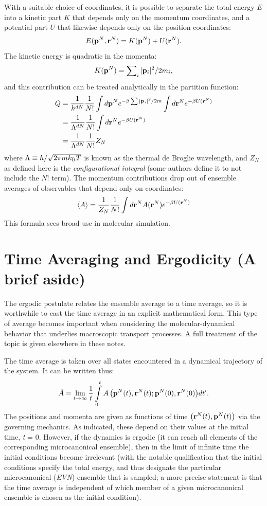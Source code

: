 \documentclass[9pt,bestpractices]{molsim}
\begin{document}
With a suitable choice of coordinates, it is possible to separate the
total energy $E$ into a kinetic part $K$ that depends only on
the momentum coordinates, and a potential part $U$ that likewise
depends only on the position coordinates:
\[E({{\bf{p}}^N},{{\bf{r}}^N}) = K({{\bf{p}}^N}) + U({{\bf{r}}^N}).\]
The kinetic energy is quadratic in the momenta:
\[K({{\bf p}^N}) = \sum\nolimits_i {|{\bf p}_i|^2/2{m_i}}, \]
and this contribution can be treated analytically in the partition
function:
\begin{align}
Q &= \frac{1}{{h^{dN}}}\frac{1}{N!}\int {d{{\bf p}^N}{e^{ - \beta \sum {|{\bf p}_i|^2/2m} }}\int {d{{\bf r}^N}} {e^{ - \beta U({{\bf r}^N})}}} \nonumber\\
 &= \frac{1}{{\Lambda ^{dN}}}\frac{1}{N!}\int {d{{\bf r}^N}} {e^{ - \beta U({{\bf r}^N})}}\nonumber\\
 &= \frac{1}{{\Lambda ^{dN}}}\frac{1}{N!}{Z_N}\nonumber
\end{align}
where $\Lambda \equiv h/\sqrt{2\pi mk_{\rm B}T}$ is known as the thermal de Broglie wavelength, and
$Z_N$ as defined here is the \emph{configurational
integral} (some authors define it to not include the ${N}!$ term).
The momentum contributions drop out of ensemble averages of observables
that depend only on coordinates:
\[\left\langle A \right\rangle  = \frac{1}{{{Z_N}}}\frac{1}{{N!}}\int {d{{\bf{r}}^N}A({{\bf{r}}^N}){e^{ - \beta U({{\bf{r}}^N})}}} \]
This formula sees broad use in molecular simulation.

\section{Time Averaging and Ergodicity (A brief
aside)}\label{time-averaging-and-ergodicity-a-brief-aside}

The ergodic postulate relates the ensemble average to a time average, so
it is worthwhile to cast the time average in an explicit mathematical
form. This type of average becomes important when considering the
molecular-dynamical behavior that underlies macroscopic transport
processes. A full treatment of the topic is given elsewhere in these notes.

The time average is taken over all states encountered in a dynamical
trajectory of the system. It can be written thus:
\[\bar A = \mathop {\lim }\limits_{t \to \infty } \frac{1}{t}\int\limits_0^t {A\left( {{{\bf{p}}^N}(t),{{\bf{r}}^N}(t);{{\bf{p}}^N}(0),{{\bf{r}}^N}(0)} \right)} dt'.\]
The positions and momenta are given as functions of time $\left( {{{\bf{r}}^N}(t),{{\bf{p}}^N}(t)} \right)$ via the
governing mechanics. As indicated, these depend on their values at the
initial time, \emph{t} = 0. However, if the dynamics is ergodic (it can
reach all elements of the corresponding microcanonical ensemble), then
in the limit of infinite time the initial conditions become irrelevant
(with the notable qualification that the initial conditions specify the
total energy, and thus designate the particular microcanonical (\emph{EVN})
ensemble that is sampled; a more precise statement is that the time
average is independent of which member of a given microcanonical
ensemble is chosen as the initial condition).
\end{document}
